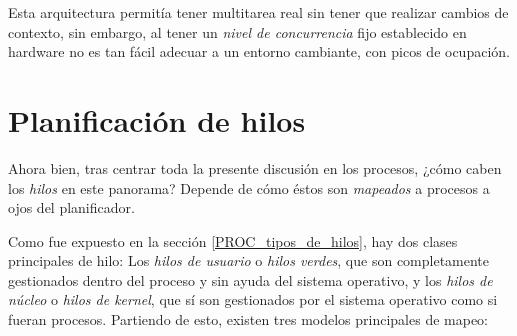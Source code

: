 \documentclass[11pt,fleqn]{book} %
\begin{document}
Esta arquitectura permitía tener multitarea real sin tener que
realizar cambios de contexto, sin embargo, al tener un \emph{nivel de concurrencia} fijo establecido en hardware no es tan fácil adecuar a
un entorno cambiante, con picos de ocupación.
\section{Planificación de hilos}
\label{sec-4-3}


Ahora bien, tras centrar toda la presente discusión en los
procesos, ¿cómo caben los \emph{hilos} en este panorama? Depende de cómo
éstos son \emph{mapeados} a procesos a ojos del planificador.

Como fue expuesto en la sección \ref{PROC_tipos_de_hilos}, hay dos
clases principales de hilo: Los \emph{hilos de usuario} o \emph{hilos verdes},
que son completamente gestionados dentro del proceso y sin ayuda del
sistema operativo, y los \emph{hilos de núcleo} o \emph{hilos de kernel}, que sí
son gestionados por el sistema operativo como si fueran
procesos. Partiendo de esto, existen tres modelos principales de
mapeo:
\end{document}

